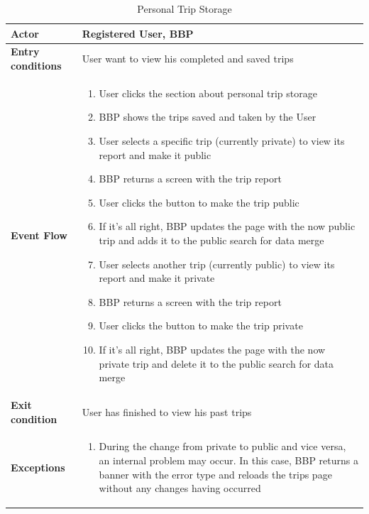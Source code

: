 \begin{table}[htbp]
\centering
\renewcommand{\arraystretch}{1.4} 
\begin{tabularx}{\textwidth}{|p{3.5cm}|X|}
\hline
\textbf{Actor} & Registered User, BBP \\ \hline
\textbf{Entry conditions} & User want to view his completed and saved trips \\ \hline
\textbf{Event Flow} & \vspace{0pt}
\begin{enumerate}[nosep, leftmargin=*] 
    \item User clicks the section about personal trip storage
    \item BBP shows the trips saved and taken by the User
    \item User selects a specific trip (currently private) to view its report and make it public
    \item BBP returns a screen with the trip report
    \item User clicks the button to make the trip public
    \item If it's all right, BBP updates the page with the now public trip and adds it to the public search for data merge
    \item User selects another trip (currently public) to view its report and make it private
    \item BBP returns a screen with the trip report
    \item User clicks the button to make the trip private
    \item If it's all right, BBP updates the page with the now private trip and delete it to the public search for data merge
\end{enumerate} \\ \hline
\textbf{Exit condition} & User has finished to view his past trips \\ \hline
\textbf{Exceptions} & \vspace{0pt}
\begin{enumerate}[nosep, leftmargin=*]
    \item During the change from private to public and vice versa, an internal problem may occur. In this case, BBP returns a banner with the error type and reloads the trips page without any changes having occurred
\end{enumerate} \\ \hline
\end{tabularx}
\caption{Personal Trip Storage}
\end{table}

